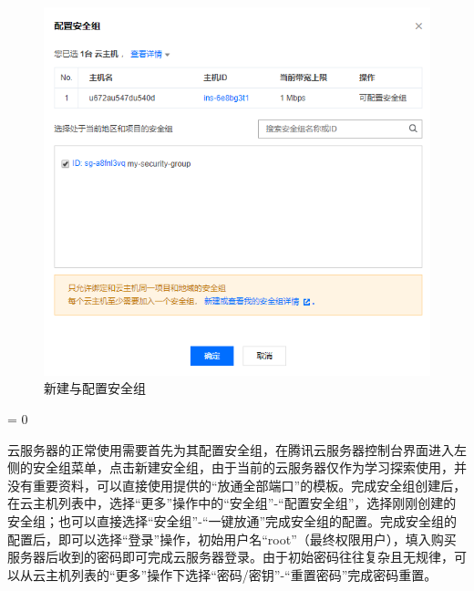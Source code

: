 \documentclass[a4paper,11pt]{ctexart}
\newcommand{\subpar}
{
	\par
	\hangafter = 0
	\setlength{\hangindent}{1em}
}
\begin{document}
\begin{spacing}{1.5}
\begin{figure}[h]
	\includegraphics[scale=0.4]{安全组3.png}
	\caption{新建与配置安全组}\label{figure:安全组2}
\end{figure}
\subpar
云服务器的正常使用需要首先为其配置安全组，在腾讯云服务器控制台界面进入左侧的安全组菜单，点击新建安全组，由于当前的云服务器仅作为学习探索使用，并没有重要资料，可以直接使用提供的“放通全部端口”的模板。完成安全组创建后，在云主机列表中，选择“更多”操作中的“安全组”-“配置安全组”，选择刚刚创建的安全组；也可以直接选择“安全组”-“一键放通”完成安全组的配置。完成安全组的配置后，即可以选择“登录”操作，初始用户名“root”（最终权限用户），填入购买服务器后收到的密码即可完成云服务器登录。由于初始密码往往复杂且无规律，可以从云主机列表的“更多”操作下选择“密码/密钥”-“重置密码”完成密码重置。
\begin{figure}[h]
	\centering
	\setlength{\abovecaptionskip}{2mm}
	\setlength{\belowcaptionskip}{-2mm}

\end{figure}
\end{spacing}
\end{document}
